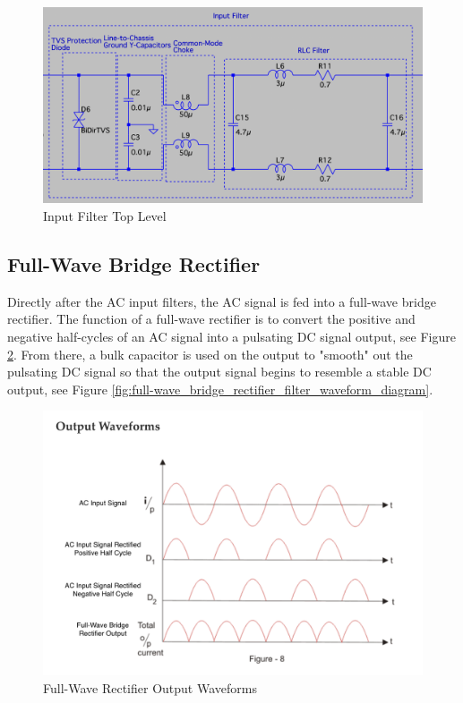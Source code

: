 \documentclass[conference]{IEEEtran}
\begin{document}
\begin{figure}[h]
    \centering
    \includegraphics[width=1.0\linewidth]{input_filter_top_level.png}
    \caption{Input Filter Top Level}
    \label{fig:input_filter_top_level_diagram}
\end{figure}

\FloatBarrier

\subsection{Full-Wave Bridge Rectifier}
Directly after the AC input filters, the AC signal is fed into a full-wave bridge rectifier. The function of a full-wave rectifier is to convert the positive and negative half-cycles of an AC signal into a pulsating DC signal output, see Figure \ref{fig:full-wave_rectifier_output_waveform_diagram}. From there, a bulk capacitor is used on the output to "smooth" out the pulsating DC signal so that the output signal begins to resemble a stable DC output, see Figure \ref{fig:full-wave_bridge_rectifier_filter_waveform_diagram}. 

\begin{figure}[h]
    \centering
    \includegraphics[width=1.0\linewidth]{full-wave_bridge_rectifier_output_waveform.png}
    \caption{Full-Wave Rectifier Output Waveforms}
    \label{fig:full-wave_rectifier_output_waveform_diagram}
\end{figure}
\end{document}
